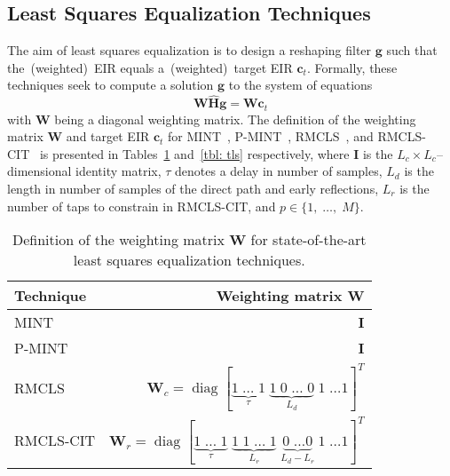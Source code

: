 \documentclass[10pt]{IEEEtran}
\DeclareMathOperator{\diag}{diag}
\begin{document}
\subsection{Least Squares Equalization Techniques}
The aim of least squares equalization is to design a reshaping filter $\mathbf{g}$ such that the~(weighted)~EIR equals a~(weighted)~target EIR $\mathbf{c}_t$. 
Formally, these techniques seek to compute a solution $\mathbf{g}$ to the system of equations
\begin{equation}
  \label{eq: lsg}
\boxed{\mathbf{W}\hat{\mathbf{H}}\mathbf{g} = \mathbf{W}\mathbf{c}_t}
\end{equation}
with $\mathbf{W}$ being a diagonal weighting matrix.
The definition of the weighting matrix $\mathbf{W}$ and target EIR $\mathbf{c}_t$ for MINT~\cite{Miyoshi_ITASS_1988}, P-MINT~\cite{Kodrasi_ITASLP_2013}, RMCLS~\cite{Zhang_IWAENC_2010}, and RMCLS-CIT~\cite{Lim_IWAENC_2012} is presented in Tables~\ref{tbl: wls} and~\ref{tbl: tls} respectively, where $\mathbf{I}$ is the $L_c \times L_c$--dimensional identity matrix, $\tau$ denotes a delay in number of samples, $L_d$ is the length in number of samples of the direct path and early reflections, $L_r$ is the number of taps to constrain in RMCLS-CIT, and $p \in \{1, \; \ldots, \; M \}$.
\begin{table}[b!]
  \centering
  \caption{Definition of the weighting matrix $\mathbf{W}$ for state-of-the-art least squares equalization techniques.}
  \label{tbl: wls}
  \begin{tabular}{|l|r|}
    \hline
    Technique & Weighting matrix $\mathbf{W}$ \\
    \hline
     MINT & $\mathbf{I}$ \\
    \hline
    P-MINT & $\mathbf{I}$ \\
    \hline
    RMCLS & $\mathbf{W}_c = {\diag}[\underbrace{1 \; \ldots \; 1}_{\tau} \; \underbrace{1 \; 0 \; \ldots \; 0}_{L_d} \; 1 \; \ldots 1]^{T}$\\
    \hline
    RMCLS-CIT & $\mathbf{W}_{r} = {\diag} [\underbrace{1 \; \ldots \; 1}_{\tau} \; \underbrace{1 \; 1 \; \ldots \; 1}_{L_{r}} \; \underbrace{0 \; \ldots 0}_{L_d-L_{r}} \; 1 \; \ldots 1]^{T}$\\
    \hline
  \end{tabular}
\end{table}
\end{document}
